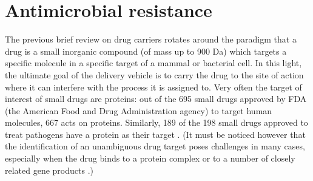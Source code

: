 \section{Antimicrobial resistance}


The previous brief review on drug carriers rotates around the paradigm that a drug is a small inorganic compound (of mass up to 900 Da) which targets a specific molecule in a specific target of a mammal or bacterial cell. In this light, the ultimate goal of the delivery vehicle is to carry the drug to the site of action where it can interfere with the process it is assigned to. Very often the target of interest of small drugs are proteins: out of the 695 small drugs approved by FDA (the American Food and Drug Administration agency) to target human molecules, 667 acts on proteins. Similarly, 189 of the 198 small drugs approved to treat pathogens have a protein as their target \cite{Santos2017}.
%
(It must be noticed however that the identification of an unambiguous drug target poses challenges in many cases, especially when the drug binds to a protein complex or to a number of closely related gene products \cite{Santos2017}.)


